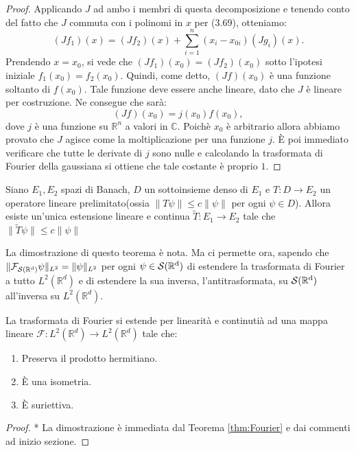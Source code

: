 \begin{proof}
Applicando $J$ ad ambo i membri di questa decomposizione e tenendo conto del fatto che $J$ commuta con i polinomi in ${x}$ per (3.69), otteniamo:
\begin{equation*}
(Jf_1)({x}) = (Jf_2)({x}) + \sum_{i=1}^n (x_i - x_{0i}) (Jg_i)({x}).
\end{equation*}
Prendendo ${x} = {x}_0$, si vede che $(Jf_1)({x}_0) = (Jf_2)({x}_0)$ sotto l'ipotesi iniziale $f_1({x}_0) = f_2({x}_0)$. Quindi, come detto, $(Jf)({x}_0)$ è una funzione soltanto di $f({x}_0)$. Tale funzione deve essere anche lineare, dato che $J$ è lineare per costruzione. Ne consegue che sarà:
\begin{equation*}
(Jf)({x}_0) = j({x}_0) f({x}_0),
\end{equation*}
dove $j$ è una funzione su $\mathbb{R}^n$ a valori in $\mathbb{C}$. Poichè $x_0$ è arbitrario allora abbiamo provato che $J$ agisce come la moltiplicazione per una funzione $j$. È poi immediato verificare che tutte le derivate di $j$ sono nulle e calcolando la trasformata di Fourier della gaussiana si ottiene che tale costante è proprio $1$.

\end{proof}

\begin{theorem}
    Siano $E_1, E_2$ spazi di Banach, $D$ un sottoinsieme denso di $E_1$ e $T: D \to E_2$ un operatore lineare prelimitato(ossia $\|T\psi\| \leq c \|\psi\|$ per ogni $\psi \in D$). Allora esiste un'unica estensione lineare e continua $\tilde{T}: E_1 \to E_2$ tale che $\|\tilde{T}\psi\| \leq c \|\psi\|$ 
\end{theorem}

La dimostrazione di questo teorema è nota. Ma ci permette ora, sapendo che $\|\mathcal{F}_{\operatorname{\mathcal{S}(\mathbb{R}^d)}} \psi \|_{L^2} = \|\psi\|_{L^2}$ per ogni $\psi \in \operatorname{\mathcal{S}(\mathbb{R}^d)}$ di estendere la trasformata di Fourier a tutto $L^2(\mathbb{R}^d)$ e di estendere la sua inversa, l'antitrasformata, su $\operatorname{\mathcal{S}(\mathbb{R}^d)}$ all'inversa su $L^2(\mathbb{R}^d)$.

\begin{theorem}
    La trasformata di Fourier si estende per linearità e continutià ad una mappa lineare $\mathcal{F} : L^2(\mathbb{R}^d) \to L^2(\mathbb{R}^d)$ tale che: 
\begin{enumerate}
    \item Preserva il prodotto hermitiano.
    \item È una isometria.
    \item È suriettiva.
\end{enumerate}
\end{theorem}
\begin{proof}* 
    La dimostrazione è immediata dal Teorema \ref{thm:Fourier} e dai commenti ad inizio sezione.
\end{proof}

